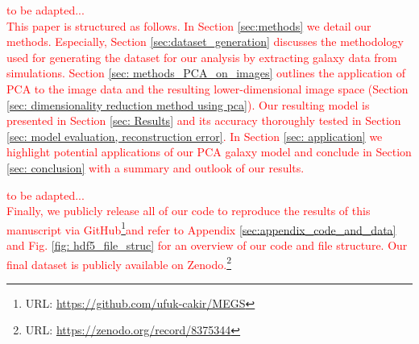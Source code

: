 \documentclass{aa}
\begin{document}
\textcolor{red}{to be adapted...\\
This paper is structured as follows. In Section \ref{sec:methods} we detail our methods. Especially, Section \ref{sec:dataset_generation} discusses the methodology used for generating the dataset for our analysis by extracting galaxy data from simulations. Section \ref{sec: methods_PCA_on_images} outlines the application of PCA to the image data and the resulting lower-dimensional image space (Section \ref{sec: dimensionality reduction method using pca}). Our resulting model is presented in Section \ref{sec: Results} and its accuracy thoroughly tested in Section \ref{sec: model evaluation, reconstruction error}. In Section \ref{sec: application} we highlight potential applications of our PCA galaxy model and conclude in Section \ref{sec: conclusion} with a summary and outlook of our results.}

\textcolor{red}{to be adapted...\\
Finally, we publicly release all of our code to reproduce the results of this manuscript via GitHub\footnote{URL: {\url{https://github.com/ufuk-cakir/MEGS}}}and refer to Appendix \ref{sec:appendix_code_and_data} and Fig. \ref{fig: hdf5_file_struc} for an overview of our code and file structure. Our final dataset is publicly available on Zenodo.\footnote{URL: \url{https://zenodo.org/record/8375344}}}


\end{document}
